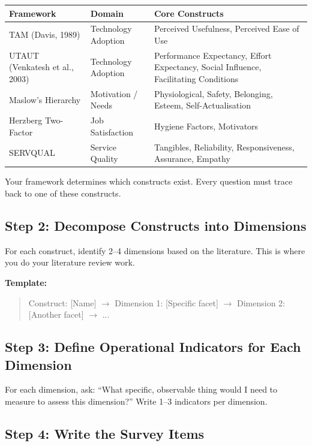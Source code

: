 \documentclass[12pt,a4paper]{article}
\begin{document}
\begin{table}[H]\centering\small
\begin{tabularx}{\textwidth}{L{4cm} L{3cm} X}
\toprule
\textbf{Framework} & \textbf{Domain} & \textbf{Core Constructs} \\
\midrule
TAM (Davis, 1989) & Technology Adoption & Perceived Usefulness, Perceived Ease of Use \\[4pt]
UTAUT (Venkatesh et al., 2003) & Technology Adoption & Performance Expectancy, Effort Expectancy, Social Influence, Facilitating Conditions \\[4pt]
Maslow's Hierarchy & Motivation / Needs & Physiological, Safety, Belonging, Esteem, Self-Actualisation \\[4pt]
Herzberg Two-Factor & Job Satisfaction & Hygiene Factors, Motivators \\[4pt]
SERVQUAL & Service Quality & Tangibles, Reliability, Responsiveness, Assurance, Empathy \\
\bottomrule
\end{tabularx}
\end{table}

Your framework determines which constructs exist. Every question must trace back to one of these constructs.

\subsection{Step 2: Decompose Constructs into Dimensions}

For each construct, identify 2--4 dimensions based on the literature. This is where you do your literature review work.

\textbf{Template:}
\begin{quote}
Construct: [Name] $\rightarrow$ Dimension 1: [Specific facet] $\rightarrow$ Dimension 2: [Another facet] $\rightarrow$ ...
\end{quote}

\subsection{Step 3: Define Operational Indicators for Each Dimension}

For each dimension, ask: ``What specific, observable thing would I need to measure to assess this dimension?'' Write 1--3 indicators per dimension.

\subsection{Step 4: Write the Survey Items}
\end{document}
